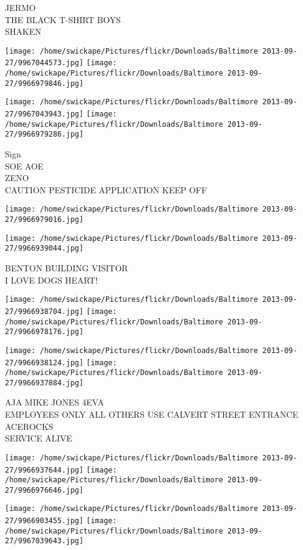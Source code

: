 \documentclass[10pt,letterpaper]{article}
\begin{document}
JERMO\\
THE BLACK T{-}SHIRT BOYS\\
SHAKEN
\pagebreak

\texttt{[image: /home/swickape/Pictures/flickr/Downloads/Baltimore 2013-09-27/9967044573.jpg]}
\texttt{[image: /home/swickape/Pictures/flickr/Downloads/Baltimore 2013-09-27/9966979846.jpg]}

\texttt{[image: /home/swickape/Pictures/flickr/Downloads/Baltimore 2013-09-27/9967043943.jpg]}
\texttt{[image: /home/swickape/Pictures/flickr/Downloads/Baltimore 2013-09-27/9966979286.jpg]}

Sign\\
SOE AOE\\
ZENO\\
CAUTION PESTICIDE APPLICATION KEEP OFF
\pagebreak

\texttt{[image: /home/swickape/Pictures/flickr/Downloads/Baltimore 2013-09-27/9966979016.jpg]}

\vspace{0.25in}
\texttt{[image: /home/swickape/Pictures/flickr/Downloads/Baltimore 2013-09-27/9966939044.jpg]}

BENTON BUILDING VISITOR\\
I LOVE DOGS HEART!
\pagebreak

\texttt{[image: /home/swickape/Pictures/flickr/Downloads/Baltimore 2013-09-27/9966938704.jpg]}
\texttt{[image: /home/swickape/Pictures/flickr/Downloads/Baltimore 2013-09-27/9966978176.jpg]}

\texttt{[image: /home/swickape/Pictures/flickr/Downloads/Baltimore 2013-09-27/9966938124.jpg]}
\texttt{[image: /home/swickape/Pictures/flickr/Downloads/Baltimore 2013-09-27/9966937884.jpg]}

AJA MIKE JONES 4EVA\\
EMPLOYEES ONLY ALL OTHERS USE CALVERT STREET ENTRANCE\\
ACEROCKS\\
SERVICE ALIVE
\pagebreak

\texttt{[image: /home/swickape/Pictures/flickr/Downloads/Baltimore 2013-09-27/9966937644.jpg]}
\texttt{[image: /home/swickape/Pictures/flickr/Downloads/Baltimore 2013-09-27/9966976646.jpg]}

\texttt{[image: /home/swickape/Pictures/flickr/Downloads/Baltimore 2013-09-27/9966903455.jpg]}
\texttt{[image: /home/swickape/Pictures/flickr/Downloads/Baltimore 2013-09-27/9967039643.jpg]}
\end{document}
